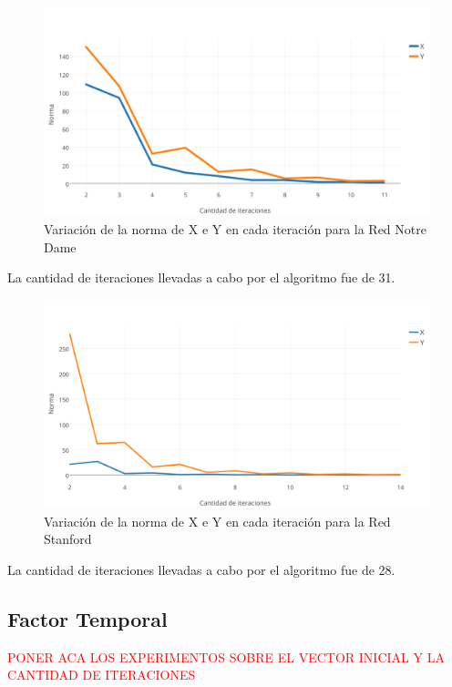 \documentclass[a4paper]{article}
\begin{document}
\begin{figure}[h!]
  \begin{center}
	\includegraphics[scale=0.50]{imagenes/exp12/notredameHITS.png}
	\caption{Variaci\'on de la norma de X e Y en cada iteraci\'on para la Red Notre Dame}
	\label{nombreparareferenciar}
  \end{center}
\end{figure}
La cantidad de iteraciones llevadas a cabo por el algoritmo fue de 31.\\


\begin{figure}[h!]
  \begin{center}
	\includegraphics[scale=0.50]{imagenes/exp12/stanfordHITS.png}
	\caption{Variaci\'on de la norma de X e Y en cada iteraci\'on para la Red Stanford}
	\label{nombreparareferenciar}
  \end{center}
\end{figure}
La cantidad de iteraciones llevadas a cabo por el algoritmo fue de 28.\\

\subsection{Factor Temporal}
\textcolor{red}{PONER ACA LOS EXPERIMENTOS SOBRE EL VECTOR INICIAL Y LA CANTIDAD DE ITERACIONES}
\end{document}
